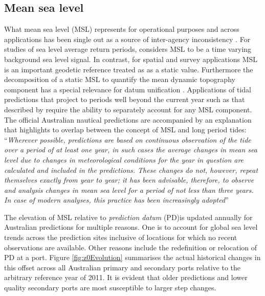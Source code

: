 \subsection{Mean sea level}
\label{Sec:MSL}
What mean sea level (MSL) represents for operational purposes and across applications has been single out as a source of inter-agency inconsistency \citep{MHL2156}.
For studies of sea level average return periods, \citeauthor{Haigh:2013bn} considers MSL to be a time varying background sea level signal.
In contrast, for spatial and survey applications MSL is an important geodetic reference treated as as a static value. Furthermore the decomposition of a static MSL to quantify the mean dynamic topography component has a special relevance for datum unification \citep{Filmer:2018cu}.
Applications of tidal predictions that project to periods well beyond the current year such as that described by \citeauthor{10.1007/s11069-021-04600-4} require the ability to separately account for any MSL component.
The official Australian nautical predictions are accompanied by an explanation that highlights to overlap between the concept of MSL and long period tides:
``\textit{Wherever possible, predictions are based on continuous observation of the tide over a period of at least one year, in such cases the average changes in mean sea level due to changes in meteorological conditions for the year in question are calculated and included in the predictions.  These changes do not, however, repeat themselves exactly from year to year; it has been advisable, therefore, to observe and analysis changes in mean sea level for a period of not less than three years.   In case of modern analyses, this practice has been increasingly adopted}'' \citep{austides}

The elevation of MSL relative to \textit{prediction datum} (PD)is updated annually for Australian predictions for multiple reasons.   One is to account for global sea level trends across the prediction sites inclusive of locations for which no recent observations are available.   Other reasons include the redefinition or relocation of PD at a port.  Figure \ref{fig:z0Evolution} summarises the actual historical 
changes in this offset across all Australian primary and secondary ports relative to the arbitrary reference year of 2011.   It is evident that older predictions and lower quality secondary ports are most susceptible to larger step changes.

